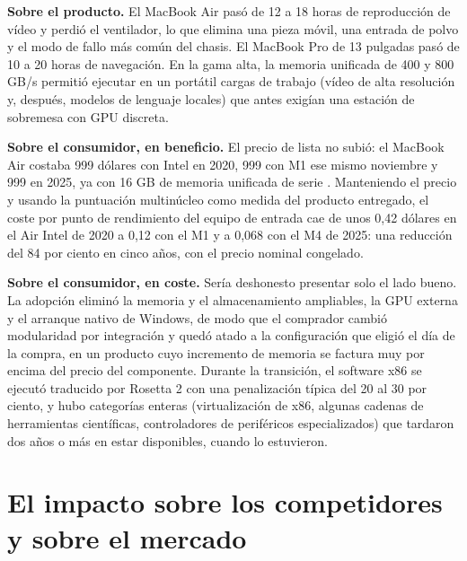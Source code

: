 \documentclass[11pt,letterpaper]{article}
\begin{document}
\textbf{Sobre el producto.} El MacBook Air pasó de 12 a 18 horas de
reproducción de vídeo y perdió el ventilador, lo que elimina una pieza móvil,
una entrada de polvo y el modo de fallo más común del chasis. El MacBook Pro
de 13 pulgadas pasó de 10 a 20 horas de navegación. En la gama alta, la
memoria unificada de 400 y 800 GB/s permitió ejecutar en un portátil cargas de
trabajo (vídeo de alta resolución y, después, modelos de lenguaje locales) que
antes exigían una estación de sobremesa con GPU discreta.

\textbf{Sobre el consumidor, en beneficio.} El precio de lista no subió: el
MacBook Air costaba 999 dólares con Intel en 2020, 999 con M1 ese mismo
noviembre y 999 en 2025, ya con 16 GB de memoria unificada de serie
\autocite{apple2025air}. Manteniendo el precio y usando la puntuación
multinúcleo como medida del producto entregado, el coste por punto de
rendimiento del equipo de entrada cae de unos 0,42 dólares en el Air Intel de
2020 a 0,12 con el M1 y a 0,068 con el M4 de 2025: una reducción del 84 por
ciento en cinco años, con el precio nominal congelado.

\textbf{Sobre el consumidor, en coste.} Sería deshonesto presentar solo el
lado bueno. La adopción eliminó la memoria y el almacenamiento ampliables, la
GPU externa y el arranque nativo de Windows, de modo que el comprador cambió
modularidad por integración y quedó atado a la configuración que eligió el
día de la compra, en un producto cuyo incremento de memoria se factura muy por
encima del precio del componente. Durante la transición, el software x86 se
ejecutó traducido por Rosetta 2 con una penalización típica del 20 al 30 por
ciento, y hubo categorías enteras (virtualización de x86, algunas cadenas de
herramientas científicas, controladores de periféricos especializados) que
tardaron dos años o más en estar disponibles, cuando lo estuvieron.

\section{El impacto sobre los competidores y sobre el mercado}
\end{document}
